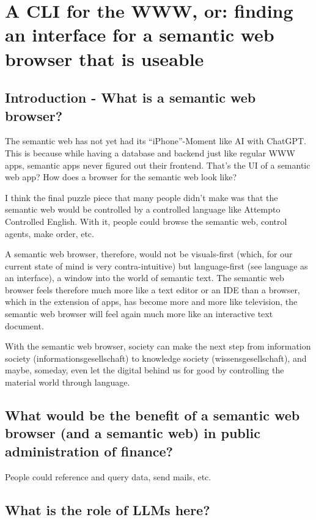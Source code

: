 \documentclass[12pt,a4paper]{article}
\begin{document}
\section{A CLI for the WWW, or: finding an interface for a semantic web browser that is useable}

\subsection{Introduction - What is a semantic web browser?}

The semantic web has not yet had its ``iPhone''-Moment like AI with ChatGPT. This is because while having a database and backend just like regular WWW apps, semantic apps never figured out their frontend. That's the UI of a semantic web app? How does a browser for the semantic web look like?

I think the final puzzle piece that many people didn't make was that the semantic web would be controlled by a controlled language like Attempto Controlled English. With it, people could browse the semantic web, control agents, make order, etc.

A semantic web browser, therefore, would not be visuals-first (which, for our current state of mind is very contra-intuitive) but language-first (see language as an interface), a window into the world of semantic text. The semantic web browser feels therefore much more like a text editor or an IDE than a browser, which in the extension of apps, has become more and more like television, the semantic web browser will feel again much more like an interactive text document.

With the semantic web browser, society can make the next step from information society (informationsgesellschaft) to knowledge society (wissensgesellschaft), and maybe, someday, even let the digital behind us for good by controlling the material world through language.

\subsection{What would be the benefit of a semantic web browser (and a semantic web) in public administration of finance?}

People could reference and query data, send mails, etc.

\subsection{What is the role of LLMs here?}
\end{document}
